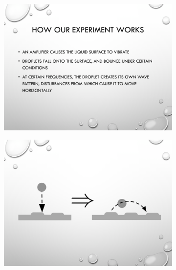 \begin{figure}[hb]
\begin{subfigure}{0.475\textwidth}
\includegraphics[width=\textwidth]{education/ppt/05.png}
\end{subfigure}
\hfill
\begin{subfigure}{0.475\textwidth}
\includegraphics[width=\textwidth]{education/ppt/06.png}
\end{subfigure}
\end{figure}

